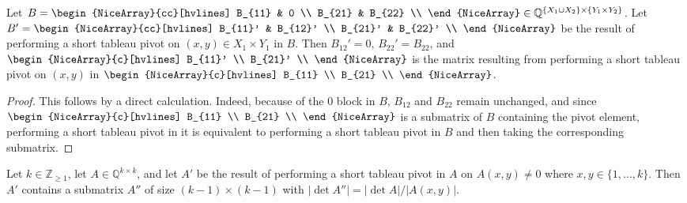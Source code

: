 \begin{lemma}\label{lem:stp_block_zero}
    Let $B = \begin{NiceArray}{cc}[hvlines] B_{11} & 0 \\ B_{21} & B_{22} \\ \end{NiceArray} \in \mathbb{Q}^{\{X_{1} \cup X_{2}\} \times \{Y_{1} \times Y_{2}\}}$. Let $B' = \begin{NiceArray}{cc}[hvlines] B_{11}' & B_{12}' \\ B_{21}' & B_{22}' \\ \end{NiceArray}$ be the result of performing a short tableau pivot on $(x, y) \in X_{1} \times Y_{1}$ in $B$. Then $B_{12}' = 0$, $B_{22}' = B_{22}$, and $\begin{NiceArray}{c}[hvlines] B_{11}' \\ B_{21}' \\ \end{NiceArray}$ is the matrix resulting from performing a short tableau pivot on $(x, y)$ in $\begin{NiceArray}{c}[hvlines] B_{11} \\ B_{21} \\ \end{NiceArray}$.
\end{lemma}

\begin{proof}
    This follows by a direct calculation. Indeed, because of the $0$ block in $B$, $B_{12}$ and $B_{22}$ remain unchanged, and since $\begin{NiceArray}{c}[hvlines] B_{11} \\ B_{21} \\ \end{NiceArray}$ is a submatrix of $B$ containing the pivot element, performing a short tableau pivot in it is equivalent to performing a short tableau pivot in $B$ and then taking the corresponding submatrix.
\end{proof}

\begin{lemma}\label{lem:pivot_nz_abs_det_eq}
    Let $k \in \mathbb{Z}_{\geq 1}$, let $A \in \mathbb{Q}^{k \times k}$, and let $A'$ be the result of performing a short tableau pivot in $A$ on $A (x, y) \neq 0$ where $x, y \in \{1, \dots, k\}$. Then $A'$ contains a submatrix $A''$ of size $(k - 1) \times (k - 1)$ with $|\det A''| = |\det A| / |A (x, y)|$.
\end{lemma}

